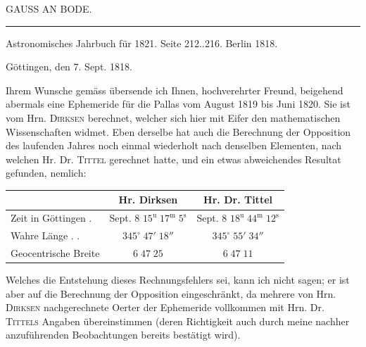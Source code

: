 \clearpage
{}
\hypertarget{native-419-part-lower}{}\label{native-419-part-lower}
\begin{center}
\Large GAUSS AN BODE.
\end{center}

\begin{center}
\rule{6cm}{0.4pt}

Astronomisches Jahrbuch für 1821. Seite 212..216. Berlin 1818.
\end{center}

\begin{flushright}Göttingen, den 7. Sept. 1818.\end{flushright}

\par\indent Ihrem Wunsche gemäss übersende ich Ihnen, hochverehrter Freund, beigehend abermals eine Ephemeride für die Pallas vom August 1819 bis Juni 1820. Sie ist vom Hrn. \textsc{Dirksen} berechnet, welcher sich hier mit Eifer den mathematischen Wissenschaften widmet. Eben derselbe hat auch die Berechnung der Opposition des laufenden Jahres noch einmal wiederholt nach denselben Elementen, nach welchen Hr. Dr. \textsc{Tittel} gerechnet hatte, und ein etwas abweichendes Resultat gefunden, nemlich:

\begin{center}
\setlength{\tabcolsep}{3pt}
\begin{tabular}{l|c|c}
 & Hr. Dirksen & Hr. Dr. Tittel \\
\hline
Zeit in Göttingen . & \shortstack{Sept. 8\\$15^{\mathrm u}\;17^{\mathrm m}\;5^{\mathrm s}$} & \shortstack{Sept. 8\\$18^{\mathrm u}\;44^{\mathrm m}\;12^{\mathrm s}$} \\
Wahre Länge . . & $345^\circ\;47'\;18''$ & $345^\circ\;55'\;34''$ \\
Geocentrische Breite & $6\;47\;25$ & $6\;47\;11$ \\
\end{tabular}
\end{center}

\par\indent Welches die Entstehung dieses Rechnungsfehlers sei, kann ich nicht sagen; er ist aber auf die Berechnung der Opposition eingeschränkt, da mehrere von Hrn. \textsc{Dirksen} nachgerechnete Oerter der  Ephemeride vollkommen mit Hrn. Dr. \textsc{Tittels} Angaben übereinstimmen (deren Richtigkeit auch durch meine nachher anzuführenden Beobachtungen bereits bestätigt wird).

